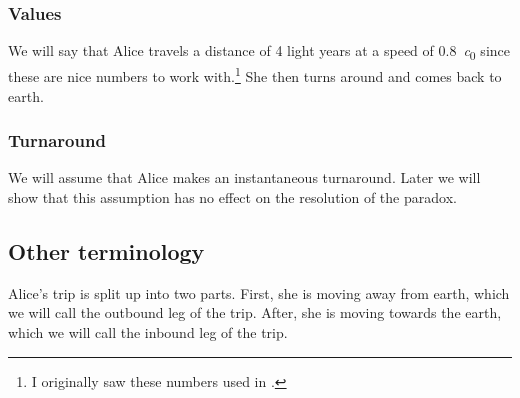 			\subsubsection{Values}
				We will say that Alice travels a distance of 4 light years at a speed of \SI{0.8}{\clight} since these are nice numbers to work with.\footnote{I originally saw these numbers used in \cite[\pno~35]{kogut2012introduction}.}
				She then turns around and comes back to earth.
			\subsubsection{Turnaround}
				We will assume that Alice makes an instantaneous turnaround.
				Later we will show that this assumption has no effect on the resolution of the paradox.
		\subsection{Other terminology}
			Alice's trip is split up into two parts.
			First, she is moving away from earth, which we will call the outbound leg of the trip.
			After, she is moving towards the earth, which we will call the inbound leg of the trip.
